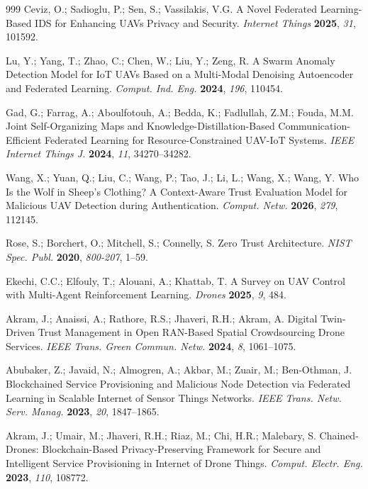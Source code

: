 \documentclass[notspecified,article,submit,moreauthors]{Definitions/mdpi}
\begin{document}
\begin{thebibliography}{999}
Ceviz, O.; Sadioglu, P.; Sen, S.; Vassilakis, V.G. A Novel Federated Learning-Based IDS for Enhancing UAVs Privacy and Security. {\em Internet Things} {\bf 2025}, {\em 31}, 101592.

Lu, Y.; Yang, T.; Zhao, C.; Chen, W.; Liu, Y.; Zeng, R. A Swarm Anomaly Detection Model for IoT UAVs Based on a Multi-Modal Denoising Autoencoder and Federated Learning. {\em Comput. Ind. Eng.} {\bf 2024}, {\em 196}, 110454.

Gad, G.; Farrag, A.; Aboulfotouh, A.; Bedda, K.; Fadlullah, Z.M.; Fouda, M.M. Joint Self-Organizing Maps and Knowledge-Distillation-Based Communication-Efficient Federated Learning for Resource-Constrained UAV-IoT Systems. {\em IEEE Internet Things J.} {\bf 2024}, {\em 11}, 34270--34282.

Wang, X.; Yuan, Q.; Liu, C.; Wang, P.; Tao, J.; Li, L.; Wang, X.; Wang, Y. Who Is the Wolf in Sheep's Clothing? A Context-Aware Trust Evaluation Model for Malicious UAV Detection during Authentication. {\em Comput. Netw.} {\bf 2026}, {\em 279}, 112145.

Rose, S.; Borchert, O.; Mitchell, S.; Connelly, S. Zero Trust Architecture. {\em NIST Spec. Publ.} {\bf 2020}, {\em 800-207}, 1--59.

Ekechi, C.C.; Elfouly, T.; Alouani, A.; Khattab, T. A Survey on UAV Control with Multi-Agent Reinforcement Learning. {\em Drones} {\bf 2025}, {\em 9}, 484.

Akram, J.; Anaissi, A.; Rathore, R.S.; Jhaveri, R.H.; Akram, A. Digital Twin-Driven Trust Management in Open RAN-Based Spatial Crowdsourcing Drone Services. {\em IEEE Trans. Green Commun. Netw.} {\bf 2024}, {\em 8}, 1061--1075.

Abubaker, Z.; Javaid, N.; Almogren, A.; Akbar, M.; Zuair, M.; Ben-Othman, J. Blockchained Service Provisioning and Malicious Node Detection via Federated Learning in Scalable Internet of Sensor Things Networks. {\em IEEE Trans. Netw. Serv. Manag.} {\bf 2023}, {\em 20}, 1847--1865.

Akram, J.; Umair, M.; Jhaveri, R.H.; Riaz, M.; Chi, H.R.; Malebary, S. Chained-Drones: Blockchain-Based Privacy-Preserving Framework for Secure and Intelligent Service Provisioning in Internet of Drone Things. {\em Comput. Electr. Eng.} {\bf 2023}, {\em 110}, 108772.


\end{thebibliography}
\end{document}
